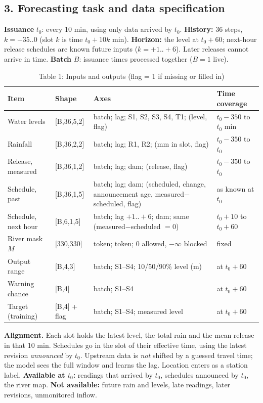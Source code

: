 \documentclass[10pt,a4paper]{article}
\begin{document}
\subsection{3. Forecasting task and data specification}
\textbf{Issuance} $t_0$: every 10 min, using only data arrived by $t_0$. \textbf{History:} 36 steps, $k=-35..0$ (slot $k$ is time $t_0+10k$ min). \textbf{Horizon:} the level at $t_0+60$; next-hour release schedules are known future inputs ($k=+1..+6$). Later releases cannot arrive in time. \textbf{Batch} $B$: issuance times processed together ($B=1$ live).

\begin{table}[!htb]
\caption{Table 1: Inputs and outputs (flag = 1 if missing or filled in)}
\scriptsize
\begin{tabularx}{\textwidth}{@{}P{2.3cm}P{1.45cm}LP{2.6cm}@{}}
\toprule
Item & Shape & Axes & Time coverage \\
\midrule
Water levels & [B,36,5,2] & batch; lag; S1, S2, S3, S4, T1; (level, flag) & $t_0-350$ to $t_0$ min \\
Rainfall & [B,36,2,2] & batch; lag; R1, R2; (mm in slot, flag) & $t_0-350$ to $t_0$ \\
Release, measured & [B,36,1,2] & batch; lag; dam; (release, flag) & $t_0-350$ to $t_0$ \\
Schedule, past & [B,36,1,5] & batch; lag; dam; (scheduled, change, announcement age, measured$-$scheduled, flag) & as known at $t_0$ \\
Schedule, next hour & [B,6,1,5] & batch; lag $+1..+6$; dam; same (measured$-$scheduled $=0$) & $t_0+10$ to $t_0+60$ \\
River mask $M$ & [330,330] & token; token; 0 allowed, $-\infty$ blocked & fixed \\
\midrule
Output range & [B,4,3] & batch; S1--S4; 10/50/90\% level (m) & at $t_0+60$ \\
Warning chance & [B,4] & batch; S1--S4 & at $t_0+60$ \\
Target (training) & [B,4] + flag & batch; S1--S4; measured level & at $t_0+60$ \\
\bottomrule
\end{tabularx}
\end{table}

\textbf{Alignment.} Each slot holds the latest level, the total rain and the mean release in that 10 min. Schedules go in the slot of their effective time, using the latest revision \emph{announced} by $t_0$. Upstream data is \emph{not} shifted by a guessed travel time; the model sees the full window and learns the lag. Location enters as a station label. \textbf{Available at $t_0$:} readings that arrived by $t_0$, schedules announced by $t_0$, the river map. \textbf{Not available:} future rain and levels, late readings, later revisions, unmonitored inflow.
\end{document}
